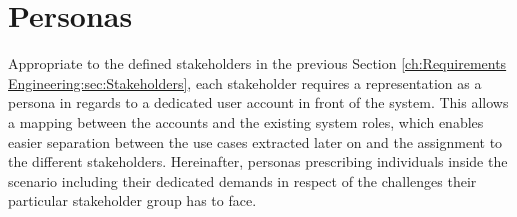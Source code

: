 \section{Personas}
\label{ch:Requirements Engineering:sec:Personas}

Appropriate to the defined stakeholders in the previous Section \ref{ch:Requirements Engineering:sec:Stakeholders}, each stakeholder requires a representation as a persona in regards to a dedicated user account in front of the system.
This allows a mapping between the accounts and the existing system roles, which enables easier separation between the use cases extracted later on and the assignment to the different stakeholders.
Hereinafter, personas prescribing individuals inside the scenario including their dedicated demands in respect of the challenges their particular stakeholder group has to face.

\newpage

